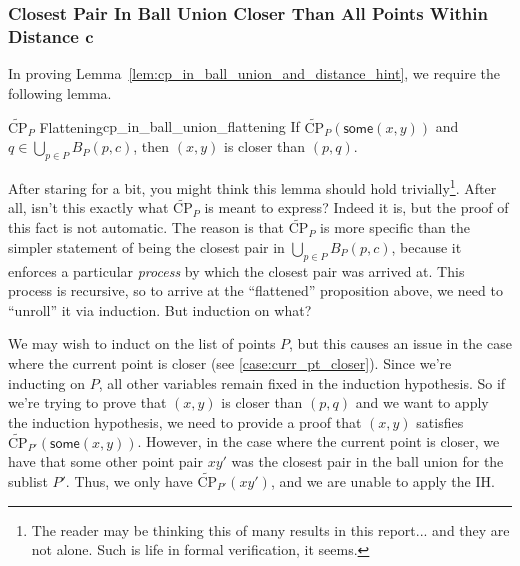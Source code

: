 \documentclass{article}
\begin{document}



\subsubsection{Closest Pair In Ball Union Closer Than All Points Within Distance $\mathbf{c}$}
\label{sec:cp_in_ball_union_high_level}
In proving Lemma~\ref{lem:cp_in_ball_union_and_distance_hint}, we require the following lemma.
\begin{tcblemma}{$\widetilde{\text{CP}}_P$ Flattening}{cp_in_ball_union_flattening}
  If $\widetilde{\text{CP}}_P(\mathsf{some}(x, y))$ and $q \in \bigcup_{p \in P} B_P(p, c)$, then $(x, y)$ is closer than $(p, q)$.
\end{tcblemma}
After staring for a bit, you might think this lemma should hold trivially\footnote{
  The reader may be thinking this of many results in this report... and they are not alone.
  Such is life in formal verification, it seems.
}.
After all, isn't this exactly what $\widetilde{\text{CP}}_P$ is meant to express?
Indeed it is, but the proof of this fact is not automatic.
The reason is that $\widetilde{\text{CP}}_P$ is more specific than the simpler statement of being the closest pair in $\bigcup_{p \in P} B_P(p, c)$, because it enforces a particular \textit{process} by which the closest pair was arrived at.
This process is recursive, so to arrive at the ``flattened'' proposition above, we need to ``unroll'' it via induction.
But induction on what?

We may wish to induct on the list of points $P$, but this causes an issue in the case where the current point is closer (see \ref{case:curr_pt_closer}).
Since we're inducting on $P$, all other variables remain fixed in the induction hypothesis.
So if we're trying to prove that $(x,y)$ is closer than $(p,q)$ and we want to apply the induction hypothesis, we need to provide a proof that $(x, y)$ satisfies $\widetilde{\text{CP}}_{P'}(\mathsf{some}(x, y))$.
However, in the case where the current point is closer, we have that some other point pair $x\!y'$ was the closest pair in the ball union for the sublist $P'$.
Thus, we only have $\widetilde{\text{CP}}_{P'}(x\!y')$, and we are unable to apply the IH.
\end{document}

